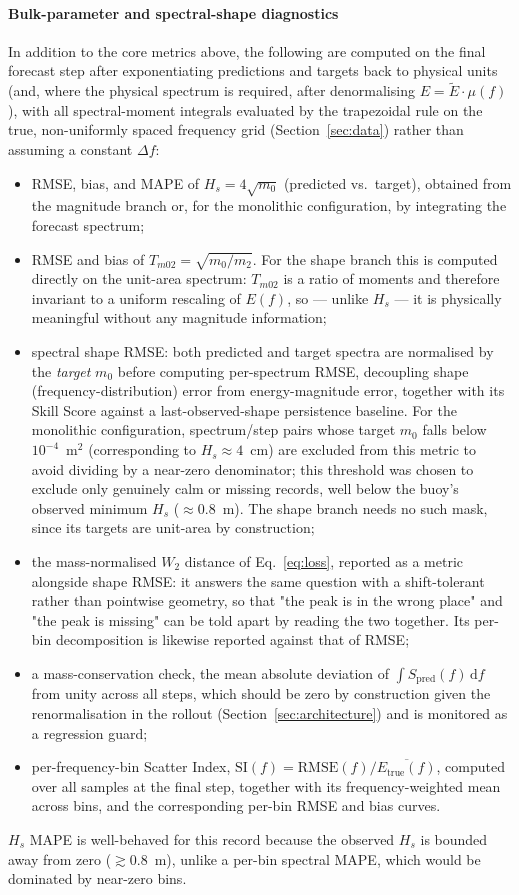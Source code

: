 \paragraph{Bulk-parameter and spectral-shape diagnostics}
In addition to the core metrics above, the following are computed on the final forecast step after exponentiating predictions and targets back to physical units (and, where the physical spectrum is required, after denormalising $E = \tilde{E}\cdot\mu(f)$), with all spectral-moment integrals evaluated by the trapezoidal rule on the true,
non-uniformly spaced frequency grid (Section~\ref{sec:data}) rather than assuming a constant $\Delta f$:
\begin{itemize}
  \item RMSE, bias, and MAPE of $H_s = 4\sqrt{m_0}$ (predicted vs.\ target), obtained from the magnitude branch or, for the monolithic configuration, by integrating the forecast spectrum;
  \item RMSE and bias of $T_{m02} = \sqrt{m_0/m_2}$. For the shape branch this is computed directly on the unit-area spectrum: $T_{m02}$ is a ratio of moments and therefore invariant to a uniform rescaling of $E(f)$, so — unlike $H_s$ — it is physically meaningful without any magnitude information;
  \item spectral shape RMSE: both predicted and target spectra are normalised by the \emph{target} $m_0$ before
    computing per-spectrum RMSE, decoupling shape (frequency-distribution) error from energy-magnitude error, together with its Skill Score against a last-observed-shape persistence baseline. For the monolithic configuration, spectrum/step pairs whose target $m_0$ falls below $10^{-4}$~m$^2$ (corresponding to $H_s \approx 4$~cm) are excluded from this metric to avoid dividing by a near-zero denominator; this threshold was chosen to exclude only genuinely calm or missing records, well below the buoy's observed minimum $H_s$ ($\approx$0.8~m). The shape branch needs no such mask, since its targets are unit-area by construction;
  \item the mass-normalised $W_2$ distance of Eq.~\eqref{eq:loss}, reported as a metric alongside shape RMSE: it answers the same question with a shift-tolerant rather than pointwise geometry, so that "the peak is in the wrong place" and "the peak is missing" can be told apart by reading the two together. Its per-bin decomposition is likewise reported against that of RMSE;
  \item a mass-conservation check, the mean absolute deviation of $\int S_{\text{pred}}(f)\,\mathrm{d}f$ from unity across all steps, which should be zero by construction given the renormalisation in the rollout (Section~\ref{sec:architecture}) and is monitored as a regression guard;
  \item per-frequency-bin Scatter Index, $\mathrm{SI}(f) = \mathrm{RMSE}(f)/\overline{E_{\text{true}}(f)}$, computed over all samples at the final step, together with its frequency-weighted mean across bins, and the corresponding per-bin RMSE and bias curves.
\end{itemize}
$H_s$ MAPE is well-behaved for this record because the observed $H_s$ is
bounded away from zero ($\gtrsim$0.8~m), unlike a per-bin spectral MAPE,
which would be dominated by near-zero bins.

